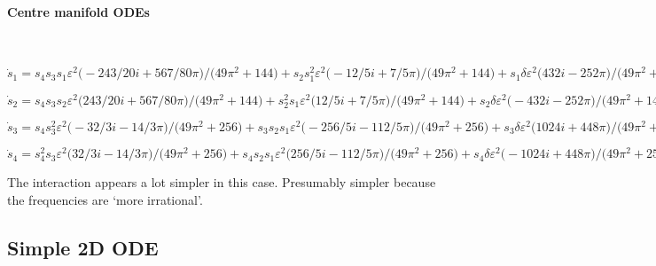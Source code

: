 \documentclass[11pt,a5paper]{article}
\begin{document}
\paragraph{Centre manifold ODEs}
\ 

\begin{math}
\dot s_{1}=s_{4} s_{3} s_{1} \varepsilon ^{2} \big(-243/20 i+567/80 \pi 
\big)/\big(49 \pi ^{2}+144\big)+s_{2} s_{1}^{2} \varepsilon ^{2} \big(-
12/5 i+7/5 \pi \big)/\big(49 \pi ^{2}+144\big)+s_{1} \delta  
\varepsilon ^{2} \big(432 i-252 \pi \big)/\big(49 \pi ^{2}+144\big)+s_{1
} \nu  \varepsilon ^{2} \big(-768 i+448 \pi \big)/\big(49 \pi ^{2}+144
\big)
\end{math}\par

\begin{math}
\dot s_{2}=s_{4} s_{3} s_{2} \varepsilon ^{2} \big(243/20 i+567/80 \pi 
\big)/\big(49 \pi ^{2}+144\big)+s_{2}^{2} s_{1} \varepsilon ^{2} \big(12
/5 i+7/5 \pi \big)/\big(49 \pi ^{2}+144\big)+s_{2} \delta  \varepsilon 
^{2} \big(-432 i-252 \pi \big)/\big(49 \pi ^{2}+144\big)+s_{2} \nu  
\varepsilon ^{2} \big(768 i+448 \pi \big)/\big(49 \pi ^{2}+144\big)
\end{math}\par

\begin{math}
\dot s_{3}=s_{4} s_{3}^{2} \varepsilon ^{2} \big(-32/3 i-14/3 \pi \big)/
\big(49 \pi ^{2}+256\big)+s_{3} s_{2} s_{1} \varepsilon ^{2} \big(-256/5
 i-112/5 \pi \big)/\big(49 \pi ^{2}+256\big)+s_{3} \delta  \varepsilon 
^{2} \big(1024 i+448 \pi \big)/\big(49 \pi ^{2}+256\big)
\end{math}\par

\begin{math}
\dot s_{4}=s_{4}^{2} s_{3} \varepsilon ^{2} \big(32/3 i-14/3 \pi \big)/
\big(49 \pi ^{2}+256\big)+s_{4} s_{2} s_{1} \varepsilon ^{2} \big(256/5 
i-112/5 \pi \big)/\big(49 \pi ^{2}+256\big)+s_{4} \delta  \varepsilon ^{
2} \big(-1024 i+448 \pi \big)/\big(49 \pi ^{2}+256\big)
\end{math}

The interaction appears a lot simpler in this case.  
Presumably simpler because the frequencies are `more irrational'.





\subsection{Simple 2D ODE}
\end{document}
